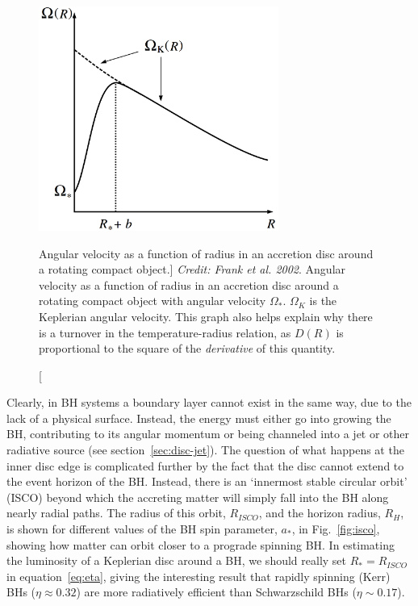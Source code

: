 \begin{figure}
\centering
\includegraphics[width=0.7\textwidth]{figures/01-intro/omega.png}
\caption
[Angular velocity as a function of radius in an accretion disc around a rotating
compact object.]
{
{\sl Credit: Frank et al. 2002}.
Angular velocity as a function of radius in an accretion disc around a rotating
compact object with angular velocity $\Omega_*$. $\Omega_K$ is the Keplerian 
angular velocity. This graph
also helps explain why there is a turnover in the temperature-radius relation,
as $D(R)$ is proportional to the square of the {\em derivative} of this quantity.
} 
\label{fig:omega}
\end{figure}

Clearly, in BH systems a boundary layer cannot exist in the same way,
due to the lack of a physical surface. Instead, the energy must either go into
growing the BH, contributing to its angular momentum or being
channeled into a jet or other radiative source (see section~\ref{sec:disc-jet}).
The question of what happens at the inner disc edge
is complicated further by the fact that the disc cannot extend to the 
event horizon of the BH. Instead, there is an `innermost stable circular orbit' (ISCO)
beyond which the accreting matter will simply fall 
into the BH along nearly radial paths. The radius
of this orbit, $R_{ISCO}$, and the horizon radius, $R_H$,
is shown for different values of the BH spin parameter, $a_*$, 
in Fig.~\ref{fig:isco}, showing how matter can orbit closer to a prograde spinning BH. 
In estimating the luminosity of a Keplerian disc around a BH, 
we should really set $R_* = R_{ISCO}$ in equation~\ref{eq:eta}, 
giving the interesting result that rapidly spinning (Kerr) BHs ($\eta\approx0.32$)
are more radiatively efficient than Schwarzschild BHs ($\eta\sim0.17$).

